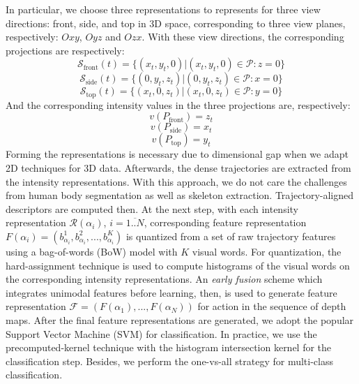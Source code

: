 \documentclass[review]{elsarticle}
\begin{document}
In particular, we choose three representations to represents for three view directions: front, side, and top in 3D space, corresponding to three view planes, respectively: $Oxy$, $Oyz$ and $Ozx$. With these view directions, the corresponding projections are respectively:
\begin{equation}
\mathcal{S}_\text{front}(t) = \{(x_t,y_t,0)\vert(x_t,y_t,0) \in \mathcal{P}:z=0\}
\end{equation}
\begin{equation}
\mathcal{S}_\text{side}(t) = \{(0,y_t,z_t)\vert(0,y_t,z_t) \in \mathcal{P}:x=0\}
\end{equation}
\begin{equation}
\mathcal{S}_\text{top}(t) = \{(x_t,0,z_t)\vert(x_t,0,z_t) \in \mathcal{P}:y=0\}
\end{equation}
And the corresponding intensity values in the three projections are, respectively:
\begin{equation}
	v(P_\text{front}) = z_t
\end{equation}
\begin{equation}
	v(P_\text{side}) = x_t
\end{equation}
\begin{equation}
	v(P_\text{top}) = y_t
\end{equation}
Forming the representations is necessary due to dimensional gap when we adapt 2D techniques for 3D data. Afterwards, the dense trajectories \cite{wang2011densetraj} are extracted from the intensity representations. With this approach, we do not care the challenges from human body segmentation as well as skeleton extraction. Trajectory-aligned descriptors are computed then. At the next step, with each intensity representation $\mathcal{R}(\alpha_i)$, $i = \overline{1..N}$, corresponding feature representation $F(\alpha_i) = (b^1_\text{$\alpha_i$},b^2_\text{$\alpha_i$},...,b^K_\text{$\alpha_i$})$ is quantized from a set of raw trajectory features using a bag-of-words (BoW) model with $K$ visual words. For quantization, the hard-assignment technique is used to compute histograms of the visual words on the corresponding intensity representations. An \textit{early fusion} scheme which integrates unimodal features before learning, then, is used to generate feature representation $\mathcal{F} = (F(\alpha_1),...,F(\alpha_N))$ for action in the sequence of depth maps. After the final feature representations are generated, we adopt the popular Support Vector Machine (SVM) for classification. In practice, we use the precomputed-kernel technique with the histogram intersection kernel for the classification step. Besides, we perform the one-vs-all strategy for multi-class classification.
\end{document}
